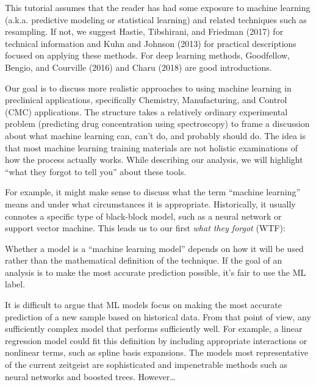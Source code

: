\documentclass[
  letterpaper,
  DIV=11,
  numbers=noendperiod]{scrartcl}
\begin{document}
This tutorial assumes that the reader has had some exposure to machine
learning (a.k.a. predictive modeling or statistical learning) and
related techniques such as resampling. If not, we suggest Hastie,
Tibshirani, and Friedman (2017) for technical information and Kuhn and
Johnson (2013) for practical descriptions focused on applying these
methods. For deep learning methods, Goodfellow, Bengio, and Courville
(2016) and Charu (2018) are good introductions.

Our goal is to discuss more realistic approaches to using machine
learning in preclinical applications, specifically Chemistry,
Manufacturing, and Control (CMC) applications. The structure takes a
relatively ordinary experimental problem (predicting drug concentration
using spectroscopy) to frame a discussion about what machine learning
can, can't do, and probably should do. The idea is that most machine
learning training materials are not holistic examinations of how the
process actually works. While describing our analysis, we will highlight
``what they forgot to tell you'' about these tools.

For example, it might make sense to discuss what the term ``machine
learning'' means and under what circumstances it is appropriate.
Historically, it usually connotes a specific type of black-block model,
such as a neural network or support vector machine. This leads us to our
first \emph{what they forgot} (WTF):

\begin{tcolorbox}[enhanced jigsaw, title=\textcolor{quarto-callout-important-color}{\faExclamation}\hspace{0.5em}{\textbf{WTF} \#1}, rightrule=.15mm, leftrule=.75mm, bottomtitle=1mm, opacityback=0, opacitybacktitle=0.6, bottomrule=.15mm, arc=.35mm, colframe=quarto-callout-important-color-frame, breakable, toprule=.15mm, toptitle=1mm, colback=white, titlerule=0mm, coltitle=black, left=2mm, colbacktitle=quarto-callout-important-color!10!white]

Whether a model is a ``machine learning model'' depends on how it will
be used rather than the mathematical definition of the technique. If the
goal of an analysis is to make the most accurate prediction possible,
it's fair to use the ML label.

\end{tcolorbox}

It is difficult to argue that ML models focus on making the most
accurate prediction of a new sample based on historical data. From that
point of view, any sufficiently complex model that performs sufficiently
well. For example, a linear regression model could fit this definition
by including appropriate interactions or nonlinear terms, such as spline
basis expansions. The models most representative of the current
zeitgeist are sophisticated and impenetrable methods such as neural
networks and boosted trees. However\ldots{}
\end{document}
